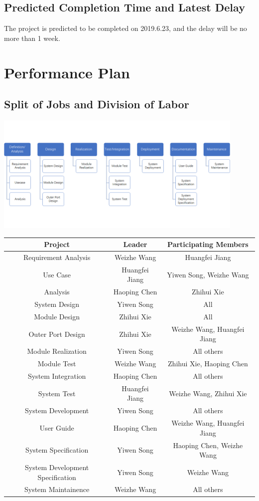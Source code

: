 \documentclass[10pt]{article}
\begin{document}
\subsection{Predicted Completion Time and Latest Delay}	
The project is predicted to be completed on 2019.6.23, and the delay will be no more than 1 week.

\section{Performance Plan}
\subsection{Split of Jobs and Division of Labor}

\begin{center}
	\includegraphics[width=12cm]{PP.png}

	\begin{tabular}{|c|c|c|} 
		\hline 
		\textbf{Project}&\textbf{Leader}&\textbf{Participating Members}\\
		\hline  
		Requirement Analysis&Weizhe Wang&Huangfei Jiang\\
		\hline 
		Use Case&Huangfei Jiang&Yiwen Song, Weizhe Wang\\
		\hline
		Analysis&Haoping Chen&Zhihui Xie\\
		\hline
		System Design&Yiwen Song&All\\
		\hline
		Module Design&Zhihui Xie&All\\
		\hline
		Outer Port Design&Zhihui Xie&Weizhe Wang, Huangfei Jiang\\
		\hline
		Module Realization&Yiwen Song&All others\\
		\hline
		Module Test&Weizhe Wang&Zhihui Xie, Haoping Chen\\
		\hline
		System Integration&Haoping Chen&All others\\
		\hline
		System Test&Huangfei Jiang&Weizhe Wang, Zhihui Xie\\
		\hline
		System Development&Yiwen Song&All others\\
		\hline
		User Guide&Haoping Chen&Weizhe Wang, Huangfei Jiang\\
		\hline
		System Specification&Yiwen Song&Haoping Chen, Weizhe Wang\\
		\hline
		System Development Specification&Yiwen Song&Weizhe Wang\\
		\hline
		System Maintainence&Weizhe Wang&All others\\
		\hline
	\end{tabular}    
\end{center}
\end{document}
